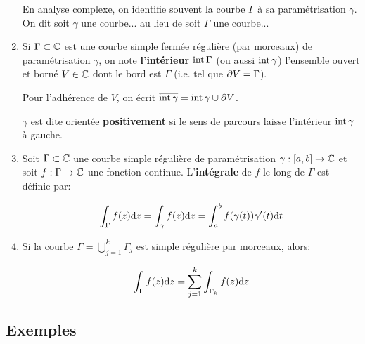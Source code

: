 \begin{definition}[10.1, p.73]
\begin{enumerate}[label=\arabic{enumi})]
    \begin{note}
        En analyse complexe, on identifie souvent la courbe $\Gamma$ à sa paramétrisation $\gamma$.
        On dit \og soit $\gamma$ une courbe... \fg{} au lieu de \og soit $\Gamma$ une courbe...\fg{}
    \end{note}

    \item
    Si $\Gamma \subset \mathbb{C}$ est une courbe simple fermée régulière (par morceaux) de paramétrisation $\gamma$, on note \textbf{l'intérieur} $\textrm{int}\, \Gamma$ (ou aussi $\textrm{int}\, \gamma$) l'ensemble ouvert et borné $V \in \mathbb{C}$ dont le bord est $\Gamma$ (i.e. tel que $\partial V = \Gamma$).
    
    Pour l'adhérence de $V$, on écrit $\overline{\textrm{int}\, \gamma} = \textrm{int}\, \gamma \cup \partial V$.
    
    \begin{note}
        $\gamma$ est dite orientée \textbf{positivement} si le sens de parcours laisse l'intérieur $\textrm{int}\, \gamma$ à gauche.
    \end{note}
    
    \item
    Soit $\Gamma \subset \mathbb{C}$ une courbe simple régulière de paramétrisation $\gamma: [a,b] \rightarrow \mathbb{C}$ et soit $f: \Gamma \rightarrow \mathbb{C}$ une fonction continue.
    L'\textbf{intégrale} de $f$ le long de $\Gamma$ est définie par:
    
    \[\int_\Gamma f(z) \mathrm{d}z = \int_\gamma f(z) \mathrm{d}z = \int_a^b f(\gamma(t)) \gamma'(t) \mathrm{d}t\]
    
    \item
    Si la courbe $\Gamma = \bigcup\limits_{j = 1}^k \Gamma_j$ est simple régulière par morceaux, alors:
    
    \[\int_\Gamma f(z) \mathrm{d}z = \sum_{j=1}^k \int_{\Gamma_k} f(z) \mathrm{d}z\]
\end{enumerate}
\end{definition}

\subsection{Exemples}

